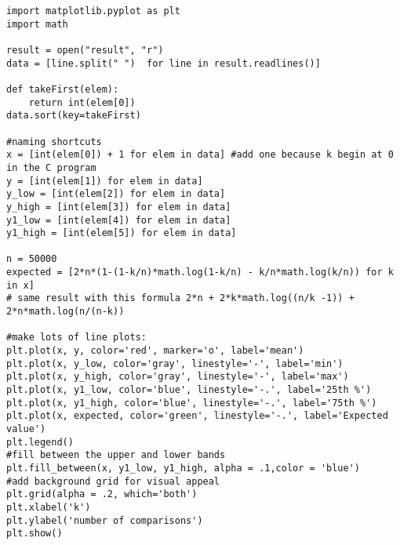 \documentclass[11pt]{article}
\begin{document}
\begin{lstlisting}
import matplotlib.pyplot as plt
import math

result = open("result", "r")
data = [line.split(" ")  for line in result.readlines()]

def takeFirst(elem):
    return int(elem[0])
data.sort(key=takeFirst)

#naming shortcuts
x = [int(elem[0]) + 1 for elem in data] #add one because k begin at 0 in the C program
y = [int(elem[1]) for elem in data]
y_low = [int(elem[2]) for elem in data]
y_high = [int(elem[3]) for elem in data]
y1_low = [int(elem[4]) for elem in data]
y1_high = [int(elem[5]) for elem in data]

n = 50000
expected = [2*n*(1-(1-k/n)*math.log(1-k/n) - k/n*math.log(k/n)) for k in x]
# same result with this formula 2*n + 2*k*math.log((n/k -1)) + 2*n*math.log(n/(n-k))

#make lots of line plots:
plt.plot(x, y, color='red', marker='o', label='mean') 
plt.plot(x, y_low, color='gray', linestyle='-', label='min') 
plt.plot(x, y_high, color='gray', linestyle='-', label='max') 
plt.plot(x, y1_low, color='blue', linestyle='-.', label='25th %') 
plt.plot(x, y1_high, color='blue', linestyle='-.', label='75th %') 
plt.plot(x, expected, color='green', linestyle='-.', label='Expected value') 
plt.legend()
#fill between the upper and lower bands
plt.fill_between(x, y1_low, y1_high, alpha = .1,color = 'blue')
#add background grid for visual appeal
plt.grid(alpha = .2, which='both')
plt.xlabel('k')
plt.ylabel('number of comparisons')
plt.show()
\end{lstlisting}
\end{document}
